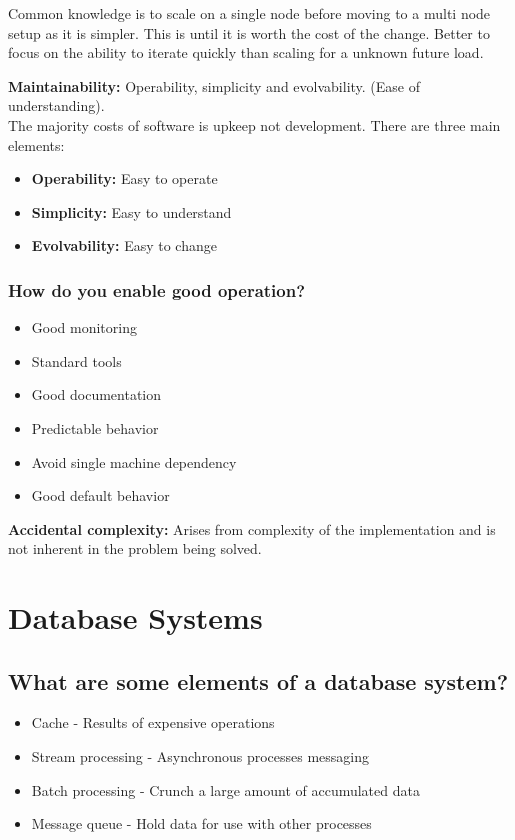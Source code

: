\documentclass[11pt]{scrartcl} %
\begin{document}
Common knowledge is to scale on a single node before moving to a multi node setup as it is simpler. This is until it
is worth the cost of the change. Better to focus on the ability to iterate quickly than scaling for a unknown future
load.

\textbf{Maintainability:} Operability, simplicity and evolvability. (Ease of understanding).\\

The majority costs of software is upkeep not development. There are three main elements:

\begin{itemize}
	\item \textbf{Operability:} Easy to operate
	\item \textbf{Simplicity:} Easy to understand
	\item \textbf{Evolvability:} Easy to change
\end{itemize}

\subsubsection{How do you enable good operation?}

\begin{itemize}
	\item Good monitoring
	\item Standard tools
	\item Good documentation
	\item Predictable behavior
	\item Avoid single machine dependency
	\item Good default behavior
\end{itemize}

\textbf{Accidental complexity:} Arises from complexity of the implementation and is not inherent in the problem being
solved.

\section{Database Systems}

\subsection{What are some elements of a database system?}

\begin{itemize}
	\item Cache - Results of expensive operations
	\item Stream processing - Asynchronous processes messaging
	\item Batch processing - Crunch a large amount of accumulated data
	\item Message queue - Hold data for use with other processes
\end{itemize}
\end{document}
